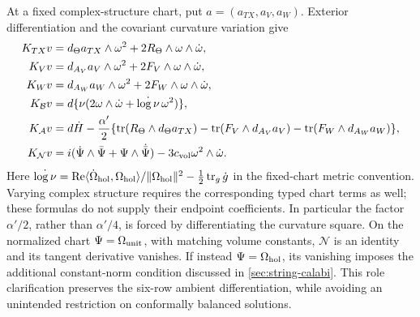 \documentclass[11pt,a4paper]{article}
\begin{document}
At a fixed complex-structure chart, put
\(a=(a_{TX},a_V,a_W)\). Exterior differentiation and the covariant
curvature variation give
\begin{align}
K_{TX}v&=d_\Theta a_{TX}\wedge\omega^2+
               2R_\Theta\wedge\omega\wedge\dot\omega,\nonumber\\
K_Vv&=d_{A_V}a_V\wedge\omega^2+
               2F_V\wedge\omega\wedge\dot\omega,\nonumber\\
K_Wv&=d_{A_W}a_W\wedge\omega^2+
               2F_W\wedge\omega\wedge\dot\omega,\nonumber\\
K_{\mathcal B}v&=d\{\nu(2\omega\wedge\dot\omega+
                                \dot{\log\nu}\,\omega^2)\},\nonumber\\
K_{\mathcal A}v&=d\dot H-\frac{\alpha'}2
  \{\operatorname{tr}(R_\Theta\wedge d_\Theta a_{TX})
       -\operatorname{tr}(F_V\wedge d_{A_V}a_V)
       -\operatorname{tr}(F_W\wedge d_{A_W}a_W)\},\nonumber\\
K_{\mathcal N}v&=i(\dot\Psi\wedge\bar\Psi+
                      \Psi\wedge\dot{\bar\Psi})
                      -3c_{\rm vol}\omega^2\wedge\dot\omega .
\label{eq:explicit-K}
\end{align}
Here \(\dot{\log\nu}=\operatorname{Re}\langle\dot\Omega_{\rm hol},
\Omega_{\rm hol}\rangle/
\|\Omega_{\rm hol}\|^2-\tfrac12\operatorname{tr}_g\dot g\) in the fixed-chart
metric convention. Varying complex structure requires the corresponding
typed chart terms as well; these formulas do not supply their endpoint
coefficients. In particular the factor \(\alpha'/2\), rather than
\(\alpha'/4\), is forced by differentiating the curvature square.
On the normalized chart \(\Psi=\Omega_{\rm unit}\), with matching volume
constants, \(\mathcal N\) is an identity and its tangent derivative vanishes.
If instead \(\Psi=\Omega_{\rm hol}\), its vanishing imposes the additional
constant-norm condition discussed in \cref{sec:string-calabi}. This role
clarification preserves the six-row ambient differentiation, while avoiding
an unintended restriction on conformally balanced solutions.
\end{document}
